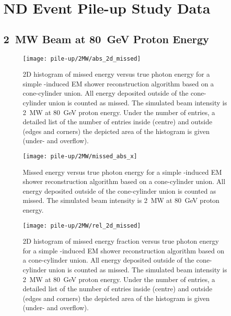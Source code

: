 \chapter{\dune{} ND Event Pile-up Study Data}
\label{chap:pile-up-data}

\section{\SI{2}{\mega\watt} Beam at \SI{80}{\giga\electronvolt} Proton Energy}

\begin{figure}[htb]
	\centering
	\texttt{[image: pile-up/2MW/abs\_2d\_missed]}
	\caption{2D histogram of missed energy versus true photon energy for a simple \Pgpz-induced EM shower reconstruction algorithm based on a cone-cylinder union.
		All energy deposited outside of the cone-cylinder union is counted as missed.
		The simulated beam intensity is \SI{2}{\mega\watt} at \SI{80}{\giga\electronvolt} proton energy.
		Under the number of entries, a detailed list of the number of entries inside (centre) and outside (edges and corners) the depicted area of the histogram is given (under- and overflow).}
\end{figure}

\begin{figure}[htb]
	\centering
	\texttt{[image: pile-up/2MW/missed\_abs\_x]}
	\caption{Missed energy versus true photon energy for a simple \Pgpz-induced EM shower reconstruction algorithm based on a cone-cylinder union.
		All energy deposited outside of the cone-cylinder union is counted as missed.
		The simulated beam intensity is \SI{2}{\mega\watt} at \SI{80}{\giga\electronvolt} proton energy.}
\end{figure}

\begin{figure}[htb]
	\centering
	\texttt{[image: pile-up/2MW/rel\_2d\_missed]}
	\caption{2D histogram of missed energy fraction versus true photon energy for a simple \Pgpz-induced EM shower reconstruction algorithm based on a cone-cylinder union.
		All energy deposited outside of the cone-cylinder union is counted as missed.
		The simulated beam intensity is \SI{2}{\mega\watt} at \SI{80}{\giga\electronvolt} proton energy.
		Under the number of entries, a detailed list of the number of entries inside (centre) and outside (edges and corners) the depicted area of the histogram is given (under- and overflow).}
\end{figure}


